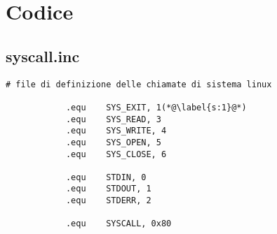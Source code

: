\documentclass[a4paper,11pt]{article}
\begin{document}
	
		\section{Codice}
		
		\subsection{syscall.inc}
		
		\begin{lstlisting}[language=MyAssembler, style=MyAsm]
			# file di definizione delle chiamate di sistema linux
			
			.equ    SYS_EXIT, 1(*@\label{s:1}@*)
			.equ    SYS_READ, 3
			.equ    SYS_WRITE, 4
			.equ    SYS_OPEN, 5
			.equ    SYS_CLOSE, 6
			
			.equ    STDIN, 0
			.equ    STDOUT, 1
			.equ    STDERR, 2
			
			.equ    SYSCALL, 0x80
		\end{lstlisting}
\end{document}
